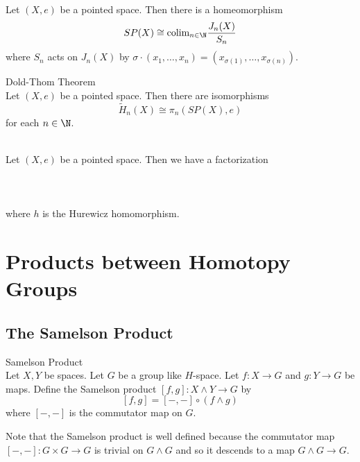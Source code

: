 \documentclass[a4paper]{article}
\begin{document}
\begin{lmm}{}{}\\
Let $(X,e)$ be a pointed space. Then there is a homeomorphism $$SP(X)\cong\text{colim}_{n\in\N}\frac{J_n(X)}{S_n}$$ where $S_n$ acts on $J_n(X)$ by $\sigma\cdot(x_1,\dots,x_n)=(x_{\sigma(1)},\dots,x_{\sigma(n)})$. 
\end{lmm}

\begin{thm}{Dold-Thom Theorem}{}\\
Let $(X,e)$ be a pointed space. Then there are isomorphisms $$\widetilde{H}_n(X)\cong\pi_n(SP(X),e)$$ for each $n\in\N$. 
\end{thm}

\begin{prp}{}{}\\
Let $(X,e)$ be a pointed space. Then we have a factorization \\~\\
\\~\\
where $h$ is the Hurewicz homomorphism. 
\end{prp}

\pagebreak
\section{Products between Homotopy Groups}
\subsection{The Samelson Product}
\begin{defn}{Samelson Product}{}\\
Let $X,Y$ be spaces. Let $G$ be a group like $H$-space. Let $f:X\to G$ and $g:Y\to G$ be maps. Define the Samelson product $[f,g]:X\wedge Y\to G$ by $$[f,g]=[-,-]\circ(f\wedge g)$$ where $[-,-]$ is the commutator map on $G$. 
\end{defn}

Note that the Samelson product is well defined because the commutator map $[-,-]:G\times G\to G$ is trivial on $G\wedge G$ and so it descends to a map $G\wedge G\to G$.
\end{document}
